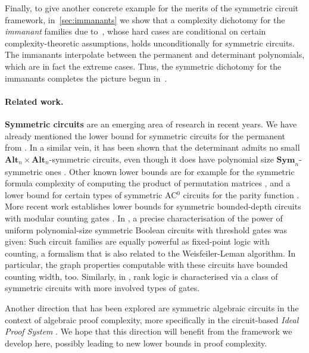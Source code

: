 \documentclass[10pt,a4paper]{article}
\theoremstyle{definition}
\theoremstyle{plain}
\theoremstyle{remark}
\newcommand{\Sym}{\mathbf{Sym}}
\newcommand{\Alt}{\mathbf{Alt}}
\begin{document}
Finally, to give another concrete example for the merits of the
symmetric circuit framework, in~\cref{sec:immanants} we show that a
complexity dichotomy for the \emph{immanant} families due to~\cite{curticapean2021full}, whose hard cases are conditional on certain complexity-theoretic assumptions, holds unconditionally for symmetric circuits. The immanants interpolate between the permanent and determinant polynomials, which are in fact the extreme cases. 
Thus, the symmetric dichotomy for the immanants completes the picture begun in~\cite{dawar_symmetric_2025}.






\paragraph{Related work.}
\textbf{Symmetric circuits} are an emerging area of research in recent years. 
We have already mentioned the lower bound for symmetric circuits for the permanent from \cite{dawar_symmetric_2025}. 
In a similar vein, it has been shown that the determinant admits no small $\Alt_n \times \Alt_n$-symmetric circuits, even though it does have polynomial size $\Sym_n$-symmetric ones \cite{dawar2021lower}.
Other known lower bounds are for example for the symmetric formula complexity of computing the product of permutation matrices \cite{HeR23}, and a lower bound for certain types of symmetric AC$^0$ circuits for the parity function \cite{Rossman19}. More recent work establishes lower bounds for symmetric bounded-depth circuits with modular counting gates \cite{KawalekW25}. 
In \cite{anderson_symmetric_2017}, a precise characterisation of the power of uniform polynomial-size symmetric Boolean circuits with threshold gates was given: Such circuit families are equally powerful as fixed-point logic with counting, a formalism that is also related to the Weisfeiler-Leman algorithm. In particular, the graph properties computable with these circuits have bounded counting width, too. Similarly, in \cite{dawar_rank_logic}, rank logic is characterised via a class of symmetric circuits with more involved types of gates. 

Another direction that has been explored are symmetric algebraic circuits in the context of algebraic proof complexity, more specifically in the circuit-based \emph{Ideal Proof System} \cite{symIPS}. We hope that this direction will benefit from the framework we develop here, possibly leading to new lower bounds in proof complexity.
\end{document}
